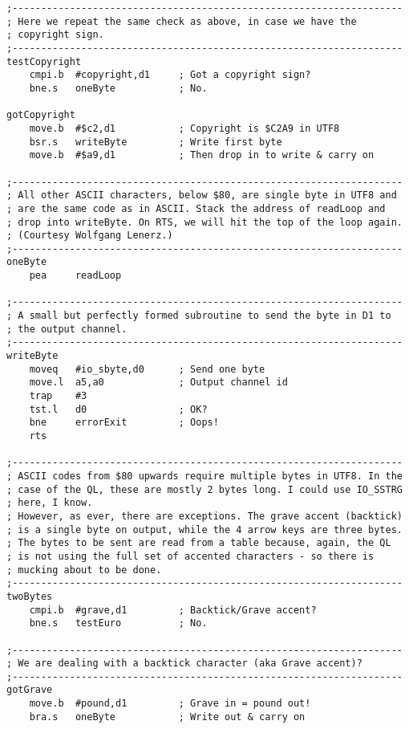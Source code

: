 \begin{lstlisting}[firstnumber=1, caption={Wolfgang's improved ql2utf8 Utility}]
;--------------------------------------------------------------------
; Here we repeat the same check as above, in case we have the
; copyright sign.
;--------------------------------------------------------------------
testCopyright
    cmpi.b  #copyright,d1     ; Got a copyright sign?
    bne.s   oneByte           ; No.

gotCopyright
    move.b  #$c2,d1           ; Copyright is $C2A9 in UTF8
    bsr.s   writeByte         ; Write first byte
    move.b  #$a9,d1           ; Then drop in to write & carry on

;--------------------------------------------------------------------
; All other ASCII characters, below $80, are single byte in UTF8 and
; are the same code as in ASCII. Stack the address of readLoop and
; drop into writeByte. On RTS, we will hit the top of the loop again.
; (Courtesy Wolfgang Lenerz.)
;--------------------------------------------------------------------
oneByte     
    pea     readLoop

;--------------------------------------------------------------------
; A small but perfectly formed subroutine to send the byte in D1 to
; the output channel.
;--------------------------------------------------------------------
writeByte
    moveq   #io_sbyte,d0      ; Send one byte
    move.l  a5,a0             ; Output channel id
    trap    #3
    tst.l   d0                ; OK?
    bne     errorExit         ; Oops!
    rts

;--------------------------------------------------------------------
; ASCII codes from $80 upwards require multiple bytes in UTF8. In the
; case of the QL, these are mostly 2 bytes long. I could use IO_SSTRG
; here, I know. 
; However, as ever, there are exceptions. The grave accent (backtick)
; is a single byte on output, while the 4 arrow keys are three bytes.
; The bytes to be sent are read from a table because, again, the QL
; is not using the full set of accented characters - so there is
; mucking about to be done.
;--------------------------------------------------------------------
twoBytes
    cmpi.b  #grave,d1         ; Backtick/Grave accent?
    bne.s   testEuro          ; No.

;--------------------------------------------------------------------
; We are dealing with a backtick character (aka Grave accent)?
;--------------------------------------------------------------------
gotGrave
    move.b  #pound,d1         ; Grave in = pound out!
    bra.s   oneByte           ; Write out & carry on


\end{lstlisting}
